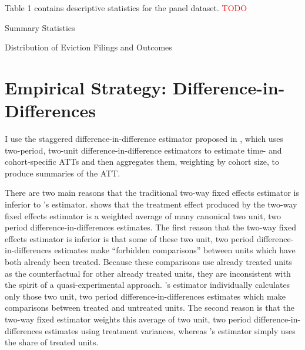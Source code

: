 \documentclass[12pt]{article}
\begin{document}
    Table 1 contains descriptive statistics for the panel dataset. \textcolor{red}{TODO}
    
    



         \begin{table}[H]
            \centering
            \small
            
            \caption{Summary Statistics}
            \label{tab:table_1}
        \end{table}


       \begin{table}[H]
            \centering
            \small
            
            \caption{Distribution of Eviction Filings and Outcomes}
            \label{tab:my_label}
        \end{table}


\section{Empirical Strategy: Difference-in-Differences}
I use the staggered difference-in-difference estimator proposed in \cite{callaway_difference--differences_2021}, which uses two-period, two-unit difference-in-difference estimators to estimate time- and cohort-specific ATTs and then aggregates them, weighting by cohort size, to produce summaries of the ATT. 

There are two main reasons that the traditional two-way fixed effects estimator is inferior to \cite{callaway_difference--differences_2021}'s estimator. \cite{goodman-bacon_difference--differences_2021} shows that the treatment effect produced by the two-way fixed effects estimator is a weighted average of many canonical two unit, two period difference-in-differences estimates. The first reason that the two-way fixed effects estimator is inferior is that some of these two unit, two period difference-in-differences estimates make ``forbidden comparisons'' between units which have both already been treated. Because these comparisons use already treated units as the counterfactual for other already treated units, they are inconsistent with the spirit of a quasi-experimental approach. \cite{callaway_difference--differences_2021}'s estimator individually calculates only those two unit, two period difference-in-differences estimates which make comparisons between treated and untreated units. The second reason is that the two-way fixed estimator weights this average of two unit, two period difference-in-differences estimates using treatment variances, whereas \cite{callaway_difference--differences_2021}'s estimator simply uses  the share of treated units.
\end{document}
